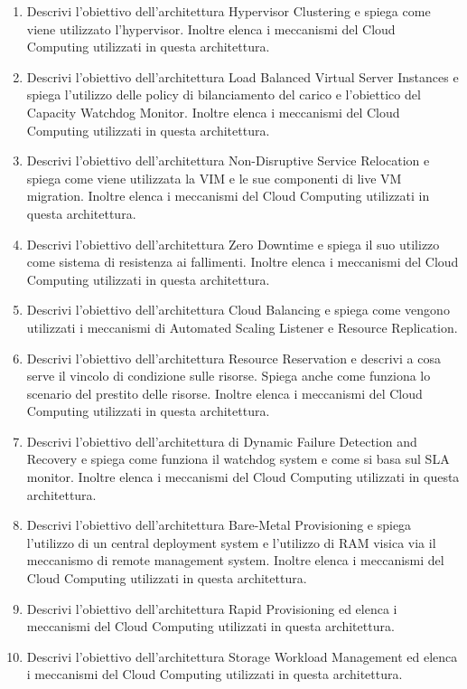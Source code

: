\begin{enumerate}
    \item Descrivi l'obiettivo dell'architettura Hypervisor Clustering e spiega come viene utilizzato l'hypervisor. Inoltre elenca i meccanismi del Cloud Computing utilizzati in questa architettura.
    \item Descrivi l'obiettivo dell'architettura Load Balanced Virtual Server Instances e spiega l'utilizzo delle policy di bilanciamento del carico e l'obiettico del Capacity Watchdog Monitor. Inoltre elenca i meccanismi del Cloud Computing utilizzati in questa architettura.
    \item Descrivi l'obiettivo dell'architettura Non-Disruptive Service Relocation e spiega come viene utilizzata la VIM e le sue componenti di live VM migration. Inoltre elenca i meccanismi del Cloud Computing utilizzati in questa architettura.
    \item Descrivi l'obiettivo dell'architettura Zero Downtime e spiega il suo utilizzo come sistema di resistenza ai fallimenti. Inoltre elenca i meccanismi del Cloud Computing utilizzati in questa architettura.
    \item Descrivi l'obiettivo dell'architettura Cloud Balancing e spiega come vengono utilizzati i meccanismi di Automated Scaling Listener e Resource Replication.
    \item Descrivi l'obiettivo dell'architettura Resource Reservation e descrivi a cosa serve il vincolo di condizione sulle risorse. Spiega anche come funziona lo scenario del prestito delle risorse. Inoltre elenca i meccanismi del Cloud Computing utilizzati in questa architettura.
    \item Descrivi l'obiettivo dell'architettura di Dynamic Failure Detection and Recovery e spiega come funziona il watchdog system e come si basa sul SLA monitor. Inoltre elenca i meccanismi del Cloud Computing utilizzati in questa architettura.
    \item Descrivi l'obiettivo dell'architettura Bare-Metal Provisioning e spiega l'utilizzo di un central deployment system e l'utilizzo di RAM visica via il meccanismo di remote management system. Inoltre elenca i meccanismi del Cloud Computing utilizzati in questa architettura.
    \item Descrivi l'obiettivo dell'architettura Rapid Provisioning ed elenca i meccanismi del Cloud Computing utilizzati in questa architettura.
    \item Descrivi l'obiettivo dell'architettura Storage Workload Management ed elenca i meccanismi del Cloud Computing utilizzati in questa architettura.
\end{enumerate}
